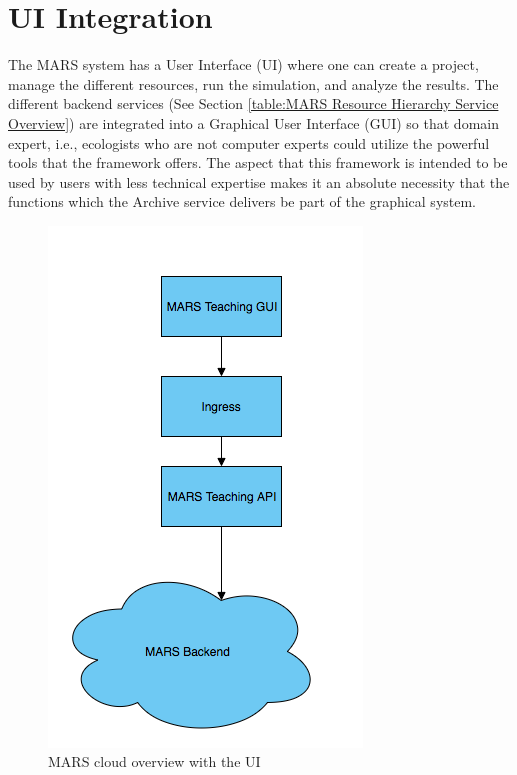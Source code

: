\section{UI Integration}
The MARS system has a User Interface (UI) where one can create a project, manage the different resources, run the simulation, and
analyze the results. The different backend services (See Section \ref{table:MARS Resource Hierarchy Service Overview}) are integrated into a Graphical
User Interface (GUI) so that domain expert, i.e., ecologists who are not computer experts could utilize the powerful tools that the framework offers.
The aspect that this framework is intended to be used by users with less technical expertise makes it an absolute necessity that
the functions which the Archive service delivers be part of the graphical system.

\begin{figure}[H]
    \centering \includegraphics[scale=0.6]{grafiken/marsIngress.png}
    \caption{MARS cloud overview with the UI}
    \label{fig:marsCloudUI}
\end{figure}


